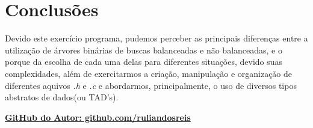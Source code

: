 \documentclass[12pt]{article}
\begin{document}
	
	\part{Conclusões}
	\hrulefill
	
	Devido este exercício programa, pudemos perceber as principais diferenças entre a utilização de árvores binárias de buscas balanceadas e não balanceadas, e o porque da escolha de cada uma delas para diferentes situações, devido suas complexidades, além de exercitarmos a criação, manipulação e organização de diferentes aquivos \textit{.h} e \textit{.c} e abordarmos, principalmente, o uso de diversos tipos abstratos de dados(ou TAD's).
	
	\begin{center}
		\textbf{\href{https://github.com/ruliandosreis}{GitHub do Autor: github.com/ruliandosreis}}
	\end{center}
\end{document}
